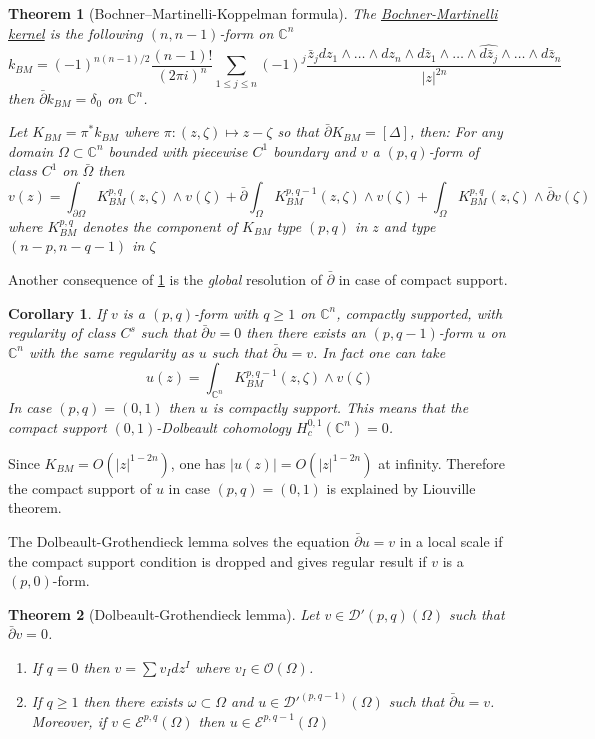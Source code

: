 \documentclass[11pt]{article}
\newtheorem{theorem}{Theorem}
\newtheorem{corollary}{Corollary}[theorem]
\begin{document}
\begin{theorem}[Bochner–Martinelli-Koppelman formula]
\label{thm:koppelman}
The \uline{Bochner-Martinelli kernel} is the following \((n,n-1)\)-form on \(\mathbb{C}^n\)
\[
k_{BM} = (-1)^{n(n-1)/2}\frac{(n-1)!}{(2\pi i)^n}\sum_{1\leq j\leq n} (-1)^j \frac{\bar
z_j dz_1\wedge \dots\wedge dz_n\wedge d\bar z_1\wedge\dots \wedge \widehat{d\bar z_j} \wedge \dots \wedge d\bar z_n}{|z|^{2n}}
\]
then \(\bar \partial k_{BM} = \delta_0\) on \(\mathbb{C}^n\).

Let \(K_{BM} = \pi^* k_{BM}\) where \(\pi: (z,\zeta)\mapsto z-\zeta\) so that \(\bar \partial K_{BM} = [\Delta]\), then: For any domain \(\Omega\subset \mathbb{C}^n\)
bounded with piecewise \(C^1\) boundary and \(v\) a \((p,q)\)-form of class \(C^1\) on \(\bar \Omega\) then
\[
v(z) = \int_{\partial\Omega}K^{p,q}_{BM}(z,\zeta)\wedge v(\zeta) + \bar \partial
\int_{\Omega} K^{p,q-1}_{BM}(z,\zeta)\wedge v(\zeta) + \int_\Omega
K^{p,q}_{BM}(z,\zeta)\wedge \bar \partial v(\zeta)
\]
where \(K^{p,q}_{BM}\) denotes the component of \(K_{BM}\) type \((p,q)\) in \(z\)
and type \((n-p, n-q-1)\) in \(\zeta\)
\end{theorem}

Another consequence of \ref{thm:koppelman} is the \emph{global} resolution of \(\bar \partial\)
in case of compact support.

\begin{corollary}
If \(v\) is a \((p,q)\)-form with \(q\geq 1\) on \(\mathbb{C}^n\), compactly supported, with regularity of class \(C^s\) such that \(\bar \partial v = 0\) then
there exists an \((p,q-1)\)-form \(u\) on \(\mathbb{C}^n\) with the same regularity
as \(u\) such
that \(\bar \partial u =v\). In fact one can take
\[
u(z) = \int_{\mathbb{C}^n} K_{BM}^{p,q-1}(z,\zeta)\wedge v(\zeta)
\]
In case \((p,q)=(0,1)\) then \(u\) is compactly support. This means that the compact
support \((0,1)\)-Dolbeault cohomology \(H_c^{0,1}(\mathbb{C}^n) = 0\).
\end{corollary}

Since \(K_{BM} = O(|z|^{1-2n})\), one has \(|u(z)| = O(|z|^{1-2n})\) at
infinity. Therefore the compact support of \(u\) in case \((p,q)=(0,1)\) is explained
by Liouville theorem.


The Dolbeault-Grothendieck lemma solves the equation \(\bar \partial u = v\) in a local
scale if the compact support condition is dropped and gives regular result if \(v\) is a \((p,0)\)-form.

\begin{theorem}[Dolbeault-Grothendieck lemma]
\label{thm:dolbeault-grothendieck}
Let \(v \in \mathcal{D}'(p,q)(\Omega)\) such that \(\bar \partial v = 0\).
\begin{enumerate}
\item If \(q=0\) then \(v = \sum v_I dz^I\) where \(v_I\in \mathcal{O}(\Omega)\).
\item If \(q \geq 1\) then there exists \(\omega\subset \Omega\) and \(u\in
   \mathcal{D}'^(p,q-1)(\Omega)\) such that \(\bar \partial u =v\). Moreover, if \(v\in
   \mathcal{E}^{p,q}(\Omega)\) then \(u\in \mathcal{E}^{p,q-1}(\Omega)\)
\end{enumerate}
\end{theorem}
\end{document}
